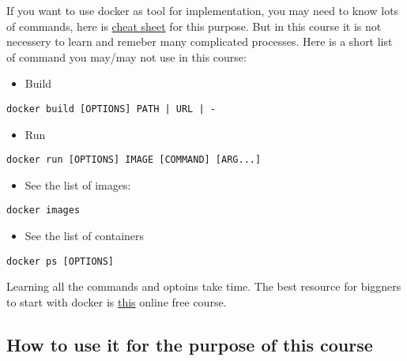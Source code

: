 \documentclass[11pt]{article}
\providecommand{\tightlist}{%
      \setlength{\itemsep}{0pt}\setlength{\parskip}{0pt}}
\begin{document}
If you want to use docker as tool for implementation, you may need to
know lots of commands, here is
\href{https://www.docker.com/sites/default/files/d8/2019-09/docker-cheat-sheet.pdf}{cheat
sheet} for this purpose. But in this course it is not necessery to learn
and remeber many complicated processes. Here is a short list of command
you may/may not use in this course:

\begin{itemize}
\tightlist
\item
  Build
\end{itemize}

\begin{verbatim}
docker build [OPTIONS] PATH | URL | -
\end{verbatim}

\begin{itemize}
\tightlist
\item
  Run
\end{itemize}

\begin{verbatim}
docker run [OPTIONS] IMAGE [COMMAND] [ARG...]
\end{verbatim}

\begin{itemize}
\tightlist
\item
  See the list of images:
\end{itemize}

\begin{verbatim}
docker images
\end{verbatim}

\begin{itemize}
\tightlist
\item
  See the list of containers
\end{itemize}

\begin{verbatim}
docker ps [OPTIONS]
\end{verbatim}

Learning all the commands and optoins take time. The best resource for
biggners to start with docker is
\href{https://kodekloud.com/p/docker-for-the-absolute-beginner-hands-on}{this}
online free course.

\hypertarget{how-to-use-it-for-the-purpose-of-this-course}{%
\subsection{How to use it for the purpose of this
course}\label{how-to-use-it-for-the-purpose-of-this-course}}
\end{document}
